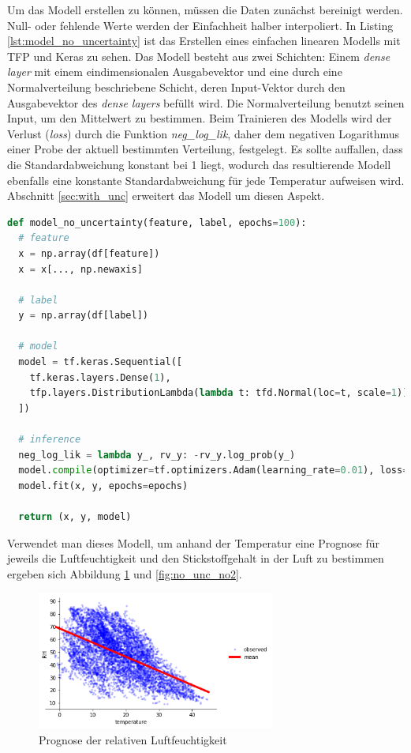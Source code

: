 \documentclass[12pt]{article}
\begin{document}
Um das Modell erstellen zu können, müssen die Daten zunächst bereinigt werden. Null- oder fehlende Werte werden der Einfachheit halber interpoliert. In Listing \ref{lst:model_no_uncertainty} ist das Erstellen eines einfachen linearen Modells mit TFP und Keras zu sehen. Das Modell besteht aus zwei Schichten: Einem \textit{dense layer} mit einem eindimensionalen Ausgabevektor und eine durch eine Normalverteilung beschriebene Schicht, deren Input-Vektor durch den Ausgabevektor des \textit{dense layers} befüllt wird. Die Normalverteilung benutzt seinen Input, um den Mittelwert zu bestimmen. Beim Trainieren des Modells wird der Verlust (\textit{loss}) durch die Funktion \textit{neg\_log\_lik}, daher dem negativen Logarithmus einer Probe der aktuell bestimmten Verteilung, festgelegt. Es sollte auffallen, dass die Standardabweichung konstant bei 1 liegt, wodurch das resultierende Modell ebenfalls eine konstante Standardabweichung für jede Temperatur aufweisen wird. Abschnitt \ref{sec:with_unc} erweitert das Modell um diesen Aspekt.

\begin{lstlisting}[language=Python, caption={Modell mit Keras ohne Unsicherheit}, label={lst:model_no_uncertainty}]
def model_no_uncertainty(feature, label, epochs=100):
  # feature
  x = np.array(df[feature])
  x = x[..., np.newaxis]

  # label
  y = np.array(df[label])
  
  # model
  model = tf.keras.Sequential([
    tf.keras.layers.Dense(1),
    tfp.layers.DistributionLambda(lambda t: tfd.Normal(loc=t, scale=1)),
  ])

  # inference
  neg_log_lik = lambda y_, rv_y: -rv_y.log_prob(y_)
  model.compile(optimizer=tf.optimizers.Adam(learning_rate=0.01), loss=neg_log_lik)
  model.fit(x, y, epochs=epochs)
  
  return (x, y, model)
\end{lstlisting}

Verwendet man dieses Modell, um anhand der Temperatur eine Prognose für jeweils die Luftfeuchtigkeit und den Stickstoffgehalt in der Luft zu bestimmen ergeben sich Abbildung \ref{fig:no_unc_rh} und \ref{fig:no_unc_no2}.

\begin{figure}[h]
    \centering
    \includegraphics[width=0.7\textwidth]{./figs/no_unc_rh.png}
    \caption{Prognose der relativen Luftfeuchtigkeit}
    \label{fig:no_unc_rh}
\end{figure}
\end{document}
